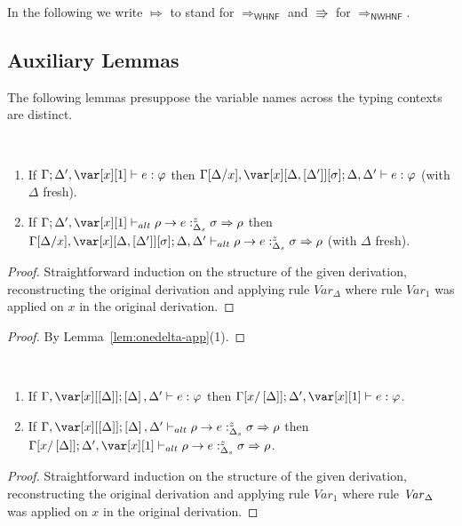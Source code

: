 \documentclass[acmsmall,review,anonymous,screen]{acmart}
\begin{document}
In the following we write $\Mapsto$ to stand for
$\Rightarrow_\mathsf{WHNF}$ and $\Rrightarrow$ for $\Rightarrow_\mathsf{NWHNF}$.

\subsection{Auxiliary Lemmas}
The following lemmas presuppose the variable names across the typing
contexts are distinct.

  \begin{lemma}~\label{lem:onedelta-app}

    \begin{enumerate}
    
      \item If $\G; \D',\xl \vdash e :\vp$
        then $\G[\D/x],\xD; \D,\D' \vdash e : \vp$ (with $\Delta$ fresh).
      \item If $\G ; \D' , \xl \vdash_{alt} \rho \rightarrow e
        :^z_{\Delta_s} \sigma \Rightarrow \rho$ then
        $\G[\D/x],\xD;\D,\D' \vdash_{alt} \rho \rightarrow e
        :^z_{\Delta_s} \sigma \Rightarrow \rho$ (with $\Delta$ fresh).
   
      \end{enumerate}
\end{lemma}
\begin{proof}
Straightforward induction on the structure of the given derivation,
reconstructing the original derivation and applying rule
$\mathit{Var}_\Delta$ where rule $\mathit{Var}_1$ was applied on
$x$ in the original derivation.
\end{proof}
\onedelta*

\begin{proof}
By Lemma~\ref{lem:onedelta-app}(1).
\end{proof}



\begin{lemma}~\label{lem:deltaone-app}

  \begin{enumerate}
 \item If $\G,\x[\irr{\D}]; \irr{\D},\D' \vdash e : \vp$
   then $\G[x/\irr{\D}]; \D',\xl \vdash e :\vp$.
 \item If $\G ,\x[\irr{\D}]; \irr{\D}, \D' \vdash_{alt} \rho \rightarrow e
   :^z_{\Delta_s} \sigma \Rightarrow \rho$ then
   $\G[x/\irr{\D}];\D',\xl \vdash_{alt} \rho \rightarrow e
   :^z_{\Delta_s} \sigma \Rightarrow \rho$.
  \end{enumerate}
\end{lemma}
\begin{proof}
Straightforward induction on the structure of the given derivation,
reconstructing the original derivation and applying rule
$\mathit{Var}_1$ where rule $\mathit{Var}_\Delta$ was applied on
$x$ in the original derivation.
\end{proof}
\end{document}
